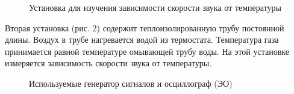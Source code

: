 \documentclass[a4paper,11pt]{extarticle} %
\begin{document}
	\begin{figure}[ht]
    \caption{Установка для изучения зависимости скорости звука от температуры}
	\end{figure}
	
	Вторая установка (рис. 2) содержит теплоизолированную трубу постоянной длины. Воздух в трубе нагревается водой из термостата. Температура газа принимается равной температуре омывающей трубу воды. На этой установке измеряется зависимость скорости звука от температуры.
	
	\begin{figure}[ht]
    \caption{Используемые генератор сигналов и осциллограф (ЭО)}
	\end{figure}
\end{document}

